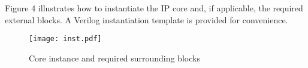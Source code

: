 Figure 4 illustrates how to instantiate the IP core and, if applicable, the
required external blocks. A Verilog instantiation template is provided for
convenience.

\begin{figure}[!htbp]
    \centerline{\texttt{[image: inst.pdf]}}
    \vspace{0cm}\caption{Core instance and required surrounding blocks}
    \label{fig:inst}
\end{figure}



